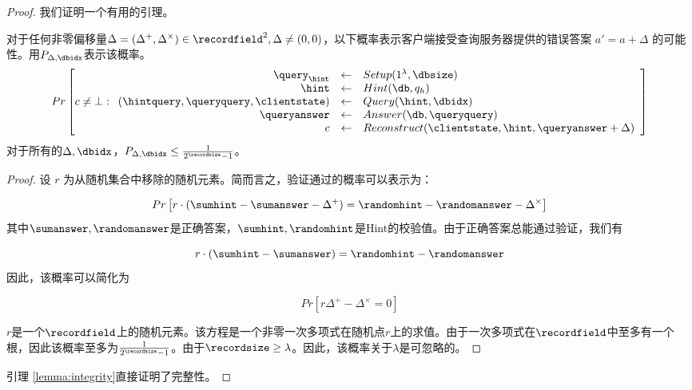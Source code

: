 \begin{proof}

我们证明一个有用的引理。

\begin{lemma}
\label{lemma:integrity}
对于任何非零偏移量$\Delta=(\Delta^+,\Delta^\times)\in \recordfield^2, \Delta \neq (0, 0)$，以下概率表示客户端接受查询服务器提供的错误答案 $a'=a + \Delta$ 的可能性。用$P_{\Delta, \dbidx}$表示该概率。
$$ Pr\left[
    c\neq \bot:
    \begin{array}{rcl}
        \query_\hint                          & \leftarrow & Setup(1^\lambda, \dbsize)                               \\
        \hint                                 & \leftarrow & Hint(\db, q_h)                                          \\
        (\hintquery,\queryquery,\clientstate) & \leftarrow & Query(\hint, \dbidx)                                    \\
        \queryanswer                          & \leftarrow & Answer(\db, \queryquery)                           \\
        c                                     & \leftarrow & Reconstruct(\clientstate, \hint, \queryanswer + \Delta) \\
    \end{array}
    \right]$$
对于所有的$\Delta, \dbidx$，$P_{\Delta, \dbidx} \leq \frac{1}{2^\recordsize-1}$。
\end{lemma}

\begin{proof}
设 $r$ 为从随机集合中移除的随机元素。简而言之，验证通过的概率可以表示为：

$$ Pr\left[ r\cdot(\sumhint-\sumanswer - \Delta^+) = \randomhint - \randomanswer -\Delta^\times \right]$$
其中$\sumanswer,\randomanswer$是正确答案，$\sumhint, \randomhint$是Hint的校验值。由于正确答案总能通过验证，我们有

$$ r\cdot(\sumhint-\sumanswer)=\randomhint - \randomanswer $$
因此，该概率可以简化为

$$ Pr\left[ r\Delta^+ - \Delta^\times = 0 \right]$$

$r$是一个$\recordfield$上的随机元素。该方程是一个非零一次多项式在随机点$r$上的求值。由于一次多项式在$\recordfield$中至多有一个根，因此该概率至多为$\frac{1}{2^\recordsize-1}$。由于$\recordsize\ge\lambda$。因此，该概率关于$\lambda$是可忽略的。
\end{proof}

引理 \ref{lemma:integrity}直接证明了完整性。
\end{proof}

